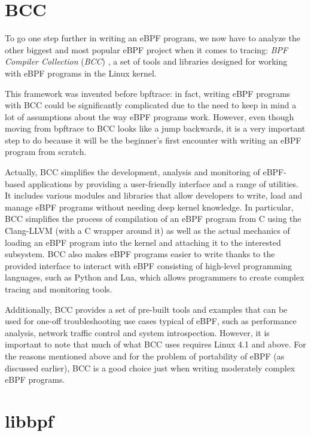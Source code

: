 \section{BCC}

To go one step further in writing an eBPF program, we now have to analyze the other biggest and most popular eBPF project when it comes to tracing: \textit{BPF Compiler Collection} (\textit{BCC}) \cite{BCCRepo}, a set of tools and libraries designed for working with eBPF programs in the Linux kernel.

This framework was invented before bpftrace: in fact, writing eBPF programs with BCC could be significantly complicated due to the need to keep in mind a lot of assumptions about the way eBPF programs work.
However, even though moving from bpftrace to BCC looks like a jump backwards, it is a very important step to do because it will be the beginner's first encounter with writing an eBPF program from scratch.
 
Actually, BCC simplifies the development, analysis and monitoring of eBPF-based applications by providing a user-friendly interface and a range of utilities. 
It includes various modules and libraries that allow developers to write, load and manage eBPF programs without needing deep kernel knowledge. 
In particular, BCC simplifies the process of compilation of an eBPF program from C using the Clang-LLVM (with a C wrapper around it) as well as the actual mechanics of loading an eBPF program into the kernel and attaching it to the interested subsystem.
BCC also makes eBPF programs easier to write thanks to the provided interface to interact with eBPF consisting of high-level programming languages, such as Python and Lua, which allows programmers to create complex tracing and monitoring tools.

Additionally, BCC provides a set of pre-built tools and examples that can be used for one-off troubleshooting use cases typical of eBPF, such as performance analysis, network traffic control and system introspection.
However, it is important to note that much of what BCC uses requires Linux 4.1 and above.
For the reasons mentioned above and for the problem of portability of eBPF (as discussed earlier), BCC is a good choice just when writing moderately complex eBPF programs.

\section{libbpf}

